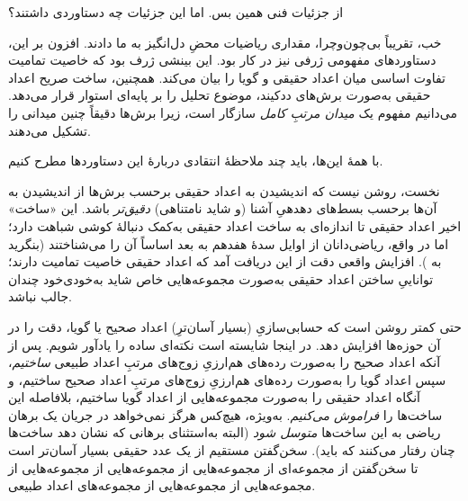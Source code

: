 \documentclass[../../../include/open-logic-section]{subfiles}
\begin{document}

از جزئیات فنی همین بس. اما این جزئیات چه دستاوردی داشتند؟

خب، تقریباً بی‌چون‌وچرا، مقداری ریاضیات محضِ {دل‌انگیز} به ما دادند.
افزون بر این، دستاوردهای مفهومی ژرفی نیز در کار بود. این بینشی ژرف بود که
خاصیت تمامیت تفاوت اساسی میان اعداد حقیقی و گویا را بیان می‌کند. همچنین،
ساخت صریح اعداد حقیقی به‌صورت برش‌های ددکیند، موضوع تحلیل را بر پایه‌ای
استوار قرار می‌دهد. می‌دانیم مفهوم یک \emph{میدان مرتبِ کامل} سازگار است،
زیرا برش‌ها دقیقاً چنین میدانی را تشکیل می‌دهند.

با همهٔ این‌ها، باید چند ملاحظهٔ انتقادی دربارهٔ این دستاوردها مطرح کنیم.

نخست، روشن نیست که اندیشیدن به اعداد حقیقی برحسب برش‌ها از اندیشیدن به
آن‌ها برحسب بسط‌های دهدهیِ آشنا (و شاید نامتناهی) \emph{دقیق‌تر} باشد.
این «ساخت» اخیر اعداد حقیقی تا اندازه‌ای به ساخت اعداد حقیقی به‌کمک دنبالهٔ
کوشی شباهت دارد؛ اما در واقع، ریاضی‌دانان از اوایل سدهٔ هفدهم به بعد اساساً
آن را می‌شناختند (بنگرید به ). افزایش واقعی دقت از این
دریافت آمد که اعداد حقیقی خاصیت تمامیت دارند؛ تواناییِ ساختن اعداد حقیقی
به‌صورت مجموعه‌هایی خاص شاید به‌خودی‌خود چندان جالب نباشد.

حتی کمتر روشن است که حسابی‌سازیِ (بسیار آسان‌ترِ) اعداد صحیح یا گویا، دقت
را در آن حوزه‌ها افزایش دهد. در اینجا شایسته است نکته‌ای ساده را یادآور
شویم. پس از آنکه اعداد صحیح را به‌صورت رده‌های هم‌ارزیِ زوج‌های مرتبِ
اعداد طبیعی \emph{ساختیم}، سپس اعداد گویا را به‌صورت رده‌های هم‌ارزیِ
زوج‌های مرتبِ اعداد صحیح ساختیم، و آنگاه اعداد حقیقی را به‌صورت مجموعه‌هایی
از اعداد گویا ساختیم، بلافاصله این ساخت‌ها را \emph{فراموش می‌کنیم}. به‌ویژه،
هیچ‌کس هرگز نمی‌خواهد در جریان یک برهان ریاضی به این ساخت‌ها \emph{متوسل
شود} (البته به‌استثنای برهانی که نشان دهد ساخت‌ها چنان رفتار می‌کنند که باید).
سخن‌گفتن مستقیم از یک عدد حقیقی بسیار آسان‌تر است تا سخن‌گفتن از مجموعه‌ای
از مجموعه‌هایی از مجموعه‌هایی از مجموعه‌هایی از مجموعه‌هایی از مجموعه‌هایی
از مجموعه‌های اعداد طبیعی.
%
%
%
	
\end{document}
